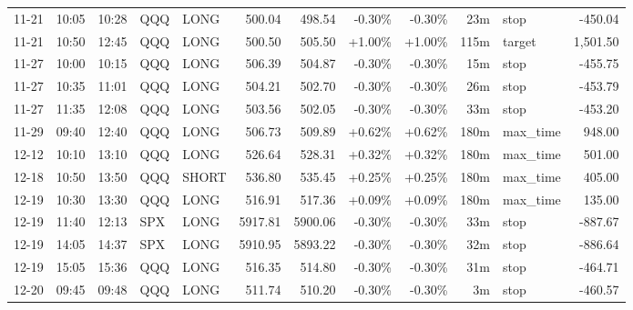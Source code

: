 \documentclass[11pt,a4paper,twoside]{article}
\begin{document}
\begin{center}
\begin{longtable}{>{\color{txtmain}}l l l l l r r r r r >{\color{txtmain}}l r}
11-21 & 10:05 & 10:28 & QQQ & LONG & 500.04 & 498.54 & \textcolor{lossred}{-0.30\%} & \textcolor{lossred}{-0.30\%} & 23m & stop & \textcolor{lossred}{-450.04} \\
11-21 & 10:50 & 12:45 & QQQ & LONG & 500.50 & 505.50 & \textcolor{wingreen}{+1.00\%} & \textcolor{wingreen}{+1.00\%} & 115m & target & \textcolor{wingreen}{1,501.50} \\
11-27 & 10:00 & 10:15 & QQQ & LONG & 506.39 & 504.87 & \textcolor{lossred}{-0.30\%} & \textcolor{lossred}{-0.30\%} & 15m & stop & \textcolor{lossred}{-455.75} \\
11-27 & 10:35 & 11:01 & QQQ & LONG & 504.21 & 502.70 & \textcolor{lossred}{-0.30\%} & \textcolor{lossred}{-0.30\%} & 26m & stop & \textcolor{lossred}{-453.79} \\
11-27 & 11:35 & 12:08 & QQQ & LONG & 503.56 & 502.05 & \textcolor{lossred}{-0.30\%} & \textcolor{lossred}{-0.30\%} & 33m & stop & \textcolor{lossred}{-453.20} \\
11-29 & 09:40 & 12:40 & QQQ & LONG & 506.73 & 509.89 & \textcolor{wingreen}{+0.62\%} & \textcolor{wingreen}{+0.62\%} & 180m & max\_time & \textcolor{wingreen}{948.00} \\
12-12 & 10:10 & 13:10 & QQQ & LONG & 526.64 & 528.31 & \textcolor{wingreen}{+0.32\%} & \textcolor{wingreen}{+0.32\%} & 180m & max\_time & \textcolor{wingreen}{501.00} \\
12-18 & 10:50 & 13:50 & QQQ & SHORT & 536.80 & 535.45 & \textcolor{wingreen}{+0.25\%} & \textcolor{wingreen}{+0.25\%} & 180m & max\_time & \textcolor{wingreen}{405.00} \\
12-19 & 10:30 & 13:30 & QQQ & LONG & 516.91 & 517.36 & \textcolor{wingreen}{+0.09\%} & \textcolor{wingreen}{+0.09\%} & 180m & max\_time & \textcolor{wingreen}{135.00} \\
12-19 & 11:40 & 12:13 & SPX & LONG & 5917.81 & 5900.06 & \textcolor{lossred}{-0.30\%} & \textcolor{lossred}{-0.30\%} & 33m & stop & \textcolor{lossred}{-887.67} \\
12-19 & 14:05 & 14:37 & SPX & LONG & 5910.95 & 5893.22 & \textcolor{lossred}{-0.30\%} & \textcolor{lossred}{-0.30\%} & 32m & stop & \textcolor{lossred}{-886.64} \\
12-19 & 15:05 & 15:36 & QQQ & LONG & 516.35 & 514.80 & \textcolor{lossred}{-0.30\%} & \textcolor{lossred}{-0.30\%} & 31m & stop & \textcolor{lossred}{-464.71} \\
12-20 & 09:45 & 09:48 & QQQ & LONG & 511.74 & 510.20 & \textcolor{lossred}{-0.30\%} & \textcolor{lossred}{-0.30\%} & 3m & stop & \textcolor{lossred}{-460.57} \\

\end{longtable}
\end{center}
\end{document}
